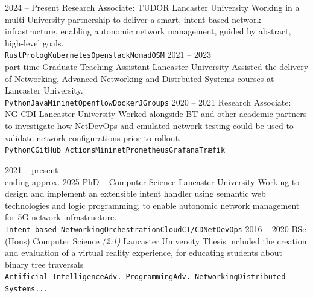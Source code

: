 \documentclass[9pt]{developercv} %
\begin{document}
\begin{entrylist}
	\entry
	{2024 -- Present}
	{Research Associate: TUDOR}
	{Lancaster University}
	{Working in a multi-University partnership to deliver a smart,
	intent-based network infrastructure, enabling autonomic network management,
	guided by abstract, high-level goals.\\
		\texttt{Rust}\slashsep\texttt{Prolog}\slashsep\texttt{Kubernetes}\slashsep\texttt{Openstack}\slashsep\texttt{Nomad}\slashsep\texttt{OSM}}
	\entry
	{2021 -- 2023\\\footnotesize{part time}}
	{Graduate Teaching Assistant}
	{Lancaster University}
	{Assisted the delivery of Networking, Advanced Networking and Distrbuted
	Systems courses at Lancaster University.\\
		\texttt{Python}\slashsep\texttt{Java}\slashsep\texttt{Mininet}\slashsep\texttt{Openflow}\slashsep\texttt{Docker}\slashsep\texttt{JGroups}}
	\entry
	{2020 -- 2021}
	{Research Associate: NG-CDI}
	{Lancaster University}
	{Worked alongside BT and other academic partners to investigate how
	NetDevOps and emulated network testing could be used to validate network configurations 
	prior to rollout.\\
		\texttt{Python}\slashsep\texttt{C}\slashsep\texttt{GitHub
		Actions}\slashsep\texttt{Mininet}\slashsep\texttt{Prometheus}\slashsep\texttt{Grafana}\slashsep\texttt{Træfik}}
\end{entrylist}


\vspace{-1em}

\begin{entrylist}
	\entry
	{2021 -- present\\\footnotesize{ending approx. 2025}}
	{PhD -- Computer Science}
	{Lancaster University}
	{Working to design and implement an extensible intent handler using semantic
	web technologies and logic programming, to enable autonomic network
	management for 5G network infrastructure.
	\\\texttt{Intent-based
	Networking}\slashsep\texttt{Orchestration}\slashsep\texttt{Cloud}\slashsep\texttt{CI/CD}\slashsep\texttt{NetDevOps}}
	\entry
	{2016 -- 2020}
	{BSc (Hons) Computer Science \textit{(2:1)}}
	{Lancaster University}
	{Thesis included the creation and evaluation of a virtual reality
	experience, for educating students about binary tree traversals
	\\\texttt{Artificial Intelligence}\slashsep\texttt{Adv.
			Programming}\slashsep\texttt{Adv. Networking}\slashsep\texttt{Distributed Systems}\slashsep\texttt{...}}
\end{entrylist}
\end{document}
